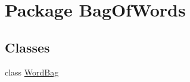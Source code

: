 \hypertarget{namespace_bag_of_words}{}\section{Package Bag\+Of\+Words}
\label{namespace_bag_of_words}
\subsection*{Classes}
\begin{DoxyCompactItemize}
\item 
class \hyperlink{class_bag_of_words_1_1_word_bag}{Word\+Bag}
\end{DoxyCompactItemize}
